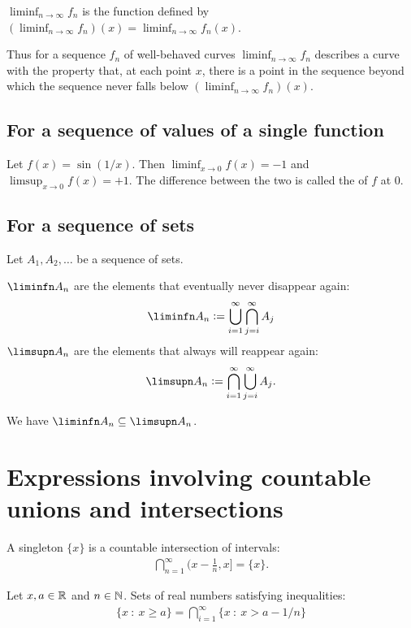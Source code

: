 $\liminf_{n\to\infty} f_n$ is the function defined by $(\liminf_{n\to\infty} f_n)(x) = \liminf_{n\to\infty} f_n(x)$.

Thus for a sequence $f_n$ of well-behaved curves $\liminf_{n\to\infty} f_n$ describes a curve with the property
that, at each point $x$, there is a point in the sequence beyond which the sequence never falls
below $(\liminf_{n\to\infty} f_n)(x)$.

\subsection{For a sequence of values of a single function}
Let $f(x) = \sin(1/x)$. Then $\liminf_{x \to 0} f(x) = -1$ and $\limsup_{x\to 0} f(x) = +1$. The difference
between the two is called the  of $f$ at $0$.

\subsection{For a sequence of sets}

Let $A_1, A_2, \ldots$ be a sequence of sets.

$\liminfn A_n$ are the elements that eventually never disappear again:
\begin{align*}
  \liminfn A_n := \bigcup_{i=1}^\infty \bigcap_{j=i}^\infty A_j
\end{align*}
$\limsupn A_n$ are the elements that always will reappear again:
\begin{align*}
  \limsupn A_n := \bigcap_{i=1}^\infty \bigcup_{j=i}^\infty A_j.
\end{align*}

We have $\liminfn A_n \subseteq \limsupn A_n$.


\section*{Expressions involving countable unions and intersections}

A singleton $\{x\}$ is a countable intersection of intervals:
    \begin{align*}
      \bigcap_{n=1}^\infty \Big(x -\frac{1}{n}, x\Big] = \{x\}.
    \end{align*}

Let $x, a \in \mathbb{R}$ and $n \in \mathbb{N}$. Sets of real numbers satisfying inequalities:
\begin{align*}
  \big\{x ~:~ x \geq a\big\} = \bigcap_{i=1}^\infty \big\{x ~:~ x > a - 1/n\big\}
\end{align*}

